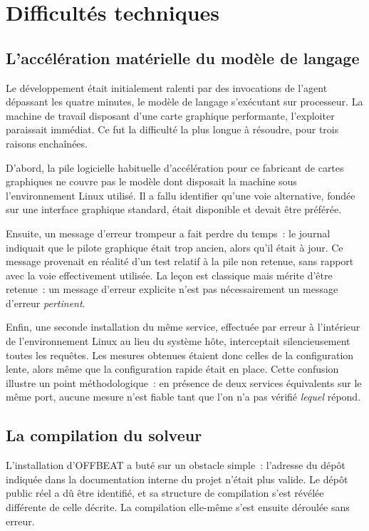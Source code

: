 \documentclass[12pt,a4paper,french]{report}
\begin{document}
\section{Difficultés techniques}

\subsection{L'accélération matérielle du modèle de langage}

Le développement était initialement ralenti par des invocations de l'agent
dépassant les quatre minutes, le modèle de langage s'exécutant sur processeur.
La machine de travail disposant d'une carte graphique performante, l'exploiter
paraissait immédiat. Ce fut la difficulté la plus longue à résoudre, pour trois
raisons enchaînées.

D'abord, la pile logicielle habituelle d'accélération pour ce fabricant de
cartes graphiques ne couvre pas le modèle dont disposait la machine sous
l'environnement Linux utilisé. Il a fallu identifier qu'une voie alternative,
fondée sur une interface graphique standard, était disponible et devait être
préférée.

Ensuite, un message d'erreur trompeur a fait perdre du temps~: le journal
indiquait que le pilote graphique était trop ancien, alors qu'il était à jour.
Ce message provenait en réalité d'un test relatif à la pile non retenue, sans
rapport avec la voie effectivement utilisée. La leçon est classique mais mérite
d'être retenue~: un message d'erreur explicite n'est pas nécessairement un
message d'erreur \emph{pertinent}.

Enfin, une seconde installation du même service, effectuée par erreur à
l'intérieur de l'environnement Linux au lieu du système hôte, interceptait
silencieusement toutes les requêtes. Les mesures obtenues étaient donc celles de
la configuration lente, alors même que la configuration rapide était en place.
Cette confusion illustre un point méthodologique~: en présence de deux services
équivalents sur le même port, aucune mesure n'est fiable tant que l'on n'a pas
vérifié \emph{lequel} répond.

\subsection{La compilation du solveur}

L'installation d'OFFBEAT a buté sur un obstacle simple~: l'adresse du dépôt
indiquée dans la documentation interne du projet n'était plus valide. Le dépôt
public réel a dû être identifié, et sa structure de compilation s'est révélée
différente de celle décrite. La compilation elle-même s'est ensuite déroulée
sans erreur.
\end{document}
